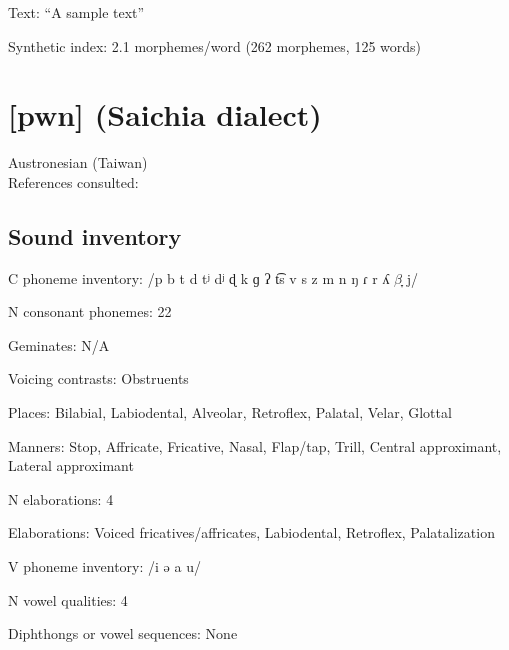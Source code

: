 {\begin{appendixdesc}

\item[Text:] “A sample text” \citep[55--58]{Leavitt1996}

\item[Synthetic index:] 2.1 morphemes/word (262 morphemes, 125 words)
\end{appendixdesc}
\section*{[pwn]  (Saichia dialect)}  %
Austronesian (Taiwan)\medskip\\
References consulted: \citet{Chang2006}

\subsection*{Sound inventory}
\begin{appendixdesc}

\item[C phoneme inventory:] /p b t d tʲ dʲ ɖ k ɡ ʔ t͡s v s z m n ŋ ɾ r ʎ $\beta ̞$ j/

\item[N consonant phonemes:] 22

\item[Geminates:] N/A

\item[Voicing contrasts:] Obstruents

\item[Places:] Bilabial, Labiodental, Alveolar, Retroflex, Palatal, Velar, Glottal

\item[Manners:] Stop, Affricate, Fricative, Nasal, Flap/tap, Trill, Central approximant, Lateral approximant

\item[N elaborations:] 4

\item[Elaborations:] Voiced fricatives/affricates, Labiodental, Retroflex, Palatalization

\item[V phoneme inventory:] /i ə a u/

\item[N vowel qualities:] 4

\item[Diphthongs or vowel sequences:] None


\end{appendixdesc}}

